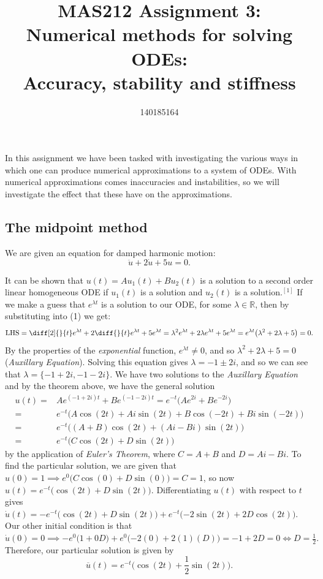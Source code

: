 \documentclass[11pt,a4paper]{article}
\title{MAS212 Assignment 3:\\Numerical methods for solving ODEs:\\Accuracy, stability and stiffness}
\author{140185164}
\date{}
\begin{document}
\maketitle
\date{}
In this assignment we have been tasked with investigating the various ways in which one can produce numerical approximations to a system of ODEs. With numerical approximations comes inaccuracies and instabilities, so we will  investigate the effect that these have on the approximations.

\subsection*{The midpoint method}
We are given an equation for damped harmonic motion:
\begin{equation}\ddot{u}+2\dot{u}+5u=0.\end{equation}

It can be shown that $u(t) = Au_1(t) + Bu_2(t)$ is a solution to a second order linear homogeneous ODE if $u_1(t)$ is a solution and $u_2(t)$ is a solution.$^{[1]}$ If we make a guess that $e^{\lambda t}$ is a solution to our ODE, for some $\lambda \in \mathbb{R}$, then by substituting into (1) we get:
\begin{align*}
\text{LHS}&=\diff[2]{}{t}e^{\lambda t} + 2\diff{}{t}e^{\lambda t} +5e^{\lambda t}
	       =\lambda ^2 e^{\lambda t} +2\lambda e^{\lambda t} +5e^{\lambda t} 
	       =e^{\lambda t} \big(\lambda^2 +2\lambda +5\big)=0.\\
\end{align*}
By the properties of the \textit{exponential} function, $e^{\lambda t }\neq 0$, and so $\lambda^2 +2\lambda +5=0$ (\textit{Auxillary Equation}). Solving this equation gives $\lambda = {-1}\pm 2i $, and so we can see that $\lambda=\{{-1}+2i,{-1}-2i\}.$ We have two solutions to the \textit{Auxillary Equation} and by the theorem above, we have the general solution
 \begin{align*}u(t)=&Ae^{({-1}+2i)t}+Be^{({-1}-2i)t}=e^{{-t}}\big(Ae^{2i}+Be^{{-2}i}\big)\\
=&e^{{-t}}\big(A\cos(2t)+Ai\sin(2t)+B\cos(-2t)+Bi\sin(-2t)\big)\\
=&e^{{-t}}\big((A+B)\cos(2t)+ (Ai-Bi)\sin(2t)\big)\\
=&e^{{-t}}\big(C\cos(2t)+D\sin(2t)\big)
\end{align*}
by the application of \textit{Euler's Theorem}, where $C=A+B$ and $D=Ai-Bi$.
To find the particular solution, we are given that $u(0)=1 \implies e^{{0}}\big(C\cos(0)+D\sin(0)\big)=C=1$, so now $u(t)=e^{{-t}}\big(\cos(2t)+D\sin(2t)\big).$ Differentiating $u(t)$ with respect to $t$ gives \\$\dot{u}(t) = -e^{{-t}}\big(\cos(2t)+D\sin(2t)\big) + e^{{-t}}\big({-2}\sin(2t) +2D\cos(2t)\big).$ Our other initial condition is that $\dot{u}(0)=0\implies -e^0\big(1+0D\big)+e^0\big({-2}(0) +2(1)(D)\big)={-1}+2D=0 \iff D=\frac{1}{2}.$ Therefore, our particular solution is given by \begin{equation}\overline{u}(t)=e^{-t}\Big(\cos(2t)+\frac{1}{2}\sin(2t)\Big).\end{equation}
\end{document}
